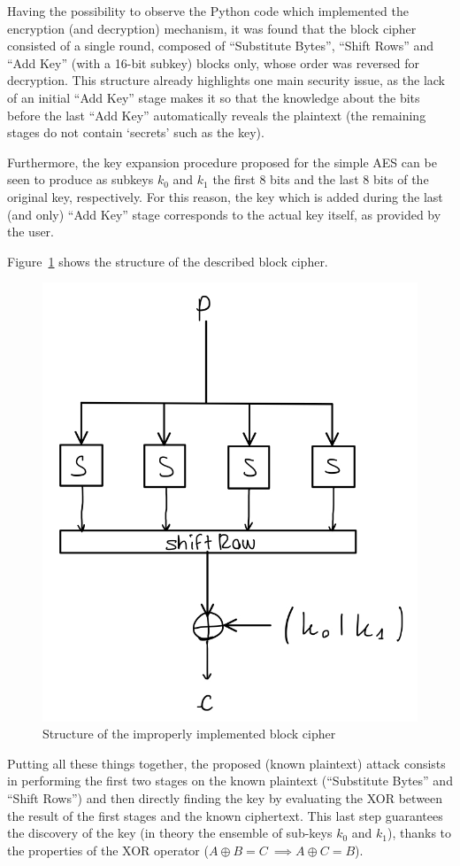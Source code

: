 \documentclass[12pt]{article}
\begin{document}
Having the possibility to observe the Python code which implemented the encryption (and decryption) mechanism, it was found that the block cipher consisted of a single round, composed of ``Substitute Bytes'', ``Shift Rows'' and ``Add Key'' (with a 16-bit subkey) blocks only, whose order was reversed for decryption.
This structure already highlights one main security issue, as the lack of an initial ``Add Key'' stage makes it so that the knowledge about the bits before the last ``Add Key'' automatically reveals the plaintext (the remaining stages do not contain `secrets' such as the key).

Furthermore, the key expansion procedure proposed for the simple AES can be seen to produce as subkeys $k_0$ and $k_1$ the first 8 bits and the last 8 bits of the original key, respectively. For this reason, the key which is added during the last (and only) ``Add Key'' stage corresponds to the actual key itself, as provided by the user.

Figure~\ref{fig:3.1} shows the structure of the described block cipher.

\begin{figure} [ht]
   \centering
   \includegraphics[width = .5\linewidth]{improper_block_scheme.jpeg}
   \caption{Structure of the improperly implemented block cipher}
   \label{fig:3.1}
\end{figure}

Putting all these things together, the proposed (known plaintext) attack consists in performing the first two stages on the known plaintext (``Substitute Bytes'' and ``Shift Rows'') and then directly finding the key by evaluating the XOR between the result of the first stages and the known ciphertext. This last step guarantees the discovery of the key (in theory the ensemble of sub-keys $k_0$ and $k_1$), thanks to the properties of the XOR operator ($A\oplus B = C\ \implies A\oplus C = B$).
\end{document}
